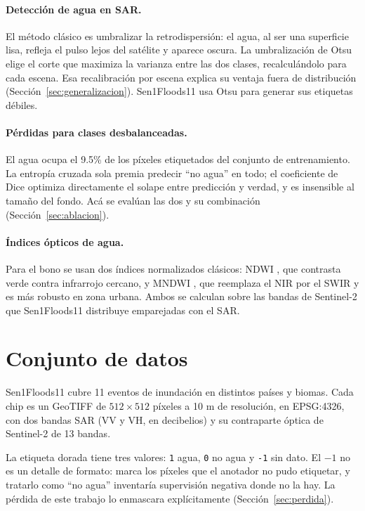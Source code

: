 \documentclass{article}
\begin{document}
\paragraph{Detección de agua en SAR.}
El método clásico es umbralizar la retrodispersión: el agua, al ser una
superficie lisa, refleja el pulso lejos del satélite y aparece oscura. La
umbralización de Otsu \citep{otsu1979threshold} elige el corte que maximiza la
varianza entre las dos clases, recalculándolo para cada escena. Esa recalibración por escena explica su
ventaja fuera de distribución (Sección~\ref{sec:generalizacion}).
Sen1Floods11 usa Otsu para generar sus etiquetas débiles.

\paragraph{Pérdidas para clases desbalanceadas.}
El agua ocupa el 9.5\% de los píxeles etiquetados del conjunto de entrenamiento.
La entropía cruzada sola premia predecir ``no agua'' en todo; el coeficiente de
Dice \citep{milletari2016vnet} optimiza directamente el solape entre predicción
y verdad, y es insensible al tamaño del fondo. Acá se evalúan las dos y su
combinación (Sección~\ref{sec:ablacion}).

\paragraph{Índices ópticos de agua.}
Para el bono se usan dos índices normalizados clásicos: NDWI
\citep{mcfeeters1996ndwi}, que contrasta verde contra infrarrojo cercano, y
MNDWI \citep{xu2006mndwi}, que reemplaza el NIR por el SWIR y es más robusto en
zona urbana. Ambos se calculan sobre las bandas de Sentinel-2
\citep{drusch2012sentinel2} que Sen1Floods11 distribuye emparejadas con el SAR.

\section{Conjunto de datos}

Sen1Floods11 cubre 11 eventos de inundación en distintos países y biomas. Cada
chip es un GeoTIFF de $512\times512$ píxeles a 10 m de resolución, en EPSG:4326,
con dos bandas SAR (VV y VH, en decibelios) y su contraparte óptica de
Sentinel-2 de 13 bandas.

La etiqueta dorada tiene tres valores: \texttt{1} agua, \texttt{0} no agua y
\texttt{-1} sin dato. El $-1$ no es un detalle de formato: marca los
píxeles que el anotador no pudo etiquetar, y tratarlo como ``no agua'' inventaría
supervisión negativa donde no la hay. La pérdida de este trabajo lo enmascara
explícitamente (Sección~\ref{sec:perdida}).
\end{document}
